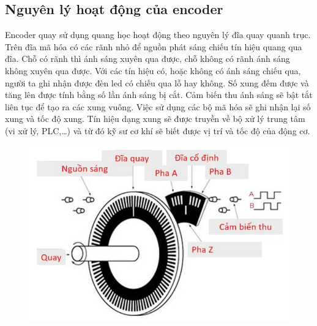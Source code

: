         \subsection{Nguyên lý hoạt động của encoder}
        Encoder quay sử dụng quang học hoạt động theo nguyên lý đĩa quay quanh trục. Trên đĩa mã hóa có các rãnh nhỏ để nguồn phát sáng chiếu tín hiệu quang qua đĩa. Chỗ có rãnh thì ánh sáng xuyên qua được, chỗ không có rãnh ánh sáng không xuyên qua được.
        Với các tín hiệu có, hoặc không có ánh sáng chiếu qua, người ta ghi nhận được đèn led có chiếu qua lỗ hay không. Số xung đếm được và tăng lên được tính bằng số lần ánh sáng bị cắt.
        Cảm biến thu ánh sáng sẽ bật tắt liên tục để tạo ra các xung vuông. Việc sử dụng các bộ mã hóa sẽ ghi nhận lại số xung và tốc độ xung. Tín hiệu dạng xung sẽ được truyền về bộ xử lý trung tâm (vi xử lý, PLC,…) và từ đó kỹ sư cơ khí sẽ biết được vị trí và tốc độ của động cơ.
        \begin{figure}[H]
            \centering
            \includegraphics[width=0.8\linewidth]{pictures/encoder6.png}
        \end{figure}
        
        \cleardoublepage